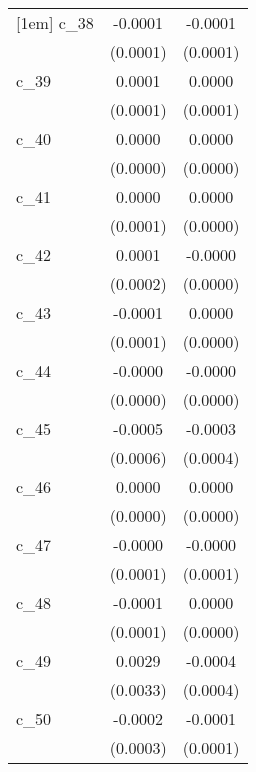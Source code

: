 {\begin{tabular}{l*{2}{c}}
[1em]
c\_38        &     -0.0001        &     -0.0001        \\
            &    (0.0001)        &    (0.0001)        \\
[1em]
c\_39        &      0.0001        &      0.0000        \\
            &    (0.0001)        &    (0.0001)        \\
[1em]
c\_40        &      0.0000        &      0.0000        \\
            &    (0.0000)        &    (0.0000)        \\
[1em]
c\_41        &      0.0000        &      0.0000        \\
            &    (0.0001)        &    (0.0000)        \\
[1em]
c\_42        &      0.0001        &     -0.0000        \\
            &    (0.0002)        &    (0.0000)        \\
[1em]
c\_43        &     -0.0001        &      0.0000        \\
            &    (0.0001)        &    (0.0000)        \\
[1em]
c\_44        &     -0.0000        &     -0.0000        \\
            &    (0.0000)        &    (0.0000)        \\
[1em]
c\_45        &     -0.0005        &     -0.0003        \\
            &    (0.0006)        &    (0.0004)        \\
[1em]
c\_46        &      0.0000        &      0.0000        \\
            &    (0.0000)        &    (0.0000)        \\
[1em]
c\_47        &     -0.0000        &     -0.0000        \\
            &    (0.0001)        &    (0.0001)        \\
[1em]
c\_48        &     -0.0001        &      0.0000        \\
            &    (0.0001)        &    (0.0000)        \\
[1em]
c\_49        &      0.0029        &     -0.0004        \\
            &    (0.0033)        &    (0.0004)        \\
[1em]
c\_50        &     -0.0002        &     -0.0001        \\
            &    (0.0003)        &    (0.0001)        \\

\end{tabular}}
